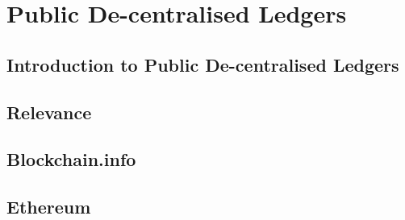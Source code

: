 \section{Public De-centralised Ledgers}

\subsection{Introduction to Public De-centralised Ledgers}

\subsection{Relevance}

\subsection{Blockchain.info}

\subsection{Ethereum}
